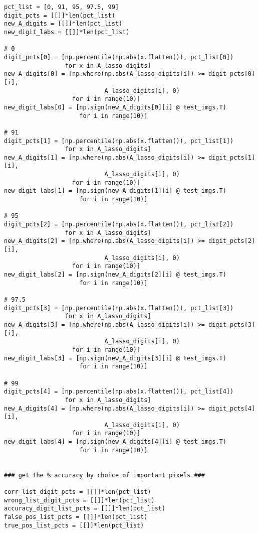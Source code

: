 \documentclass[10pt]{article}
\begin{document}
\begin{lstlisting}
pct_list = [0, 91, 95, 97.5, 99]
digit_pcts = [[]]*len(pct_list)
new_A_digits = [[]]*len(pct_list)
new_digit_labs = [[]]*len(pct_list)

# 0
digit_pcts[0] = [np.percentile(np.abs(x.flatten()), pct_list[0]) 
                 for x in A_lasso_digits]
new_A_digits[0] = [np.where(np.abs(A_lasso_digits[i]) >= digit_pcts[0][i],
                            A_lasso_digits[i], 0)
                   for i in range(10)]
new_digit_labs[0] = [np.sign(new_A_digits[0][i] @ test_imgs.T)
                     for i in range(10)]

# 91
digit_pcts[1] = [np.percentile(np.abs(x.flatten()), pct_list[1]) 
                 for x in A_lasso_digits]
new_A_digits[1] = [np.where(np.abs(A_lasso_digits[i]) >= digit_pcts[1][i],
                            A_lasso_digits[i], 0)
                   for i in range(10)]
new_digit_labs[1] = [np.sign(new_A_digits[1][i] @ test_imgs.T)
                     for i in range(10)]

# 95
digit_pcts[2] = [np.percentile(np.abs(x.flatten()), pct_list[2]) 
                 for x in A_lasso_digits]
new_A_digits[2] = [np.where(np.abs(A_lasso_digits[i]) >= digit_pcts[2][i],
                            A_lasso_digits[i], 0)
                   for i in range(10)]
new_digit_labs[2] = [np.sign(new_A_digits[2][i] @ test_imgs.T)
                     for i in range(10)]

# 97.5
digit_pcts[3] = [np.percentile(np.abs(x.flatten()), pct_list[3]) 
                 for x in A_lasso_digits]
new_A_digits[3] = [np.where(np.abs(A_lasso_digits[i]) >= digit_pcts[3][i],
                            A_lasso_digits[i], 0)
                   for i in range(10)]
new_digit_labs[3] = [np.sign(new_A_digits[3][i] @ test_imgs.T)
                     for i in range(10)]

# 99
digit_pcts[4] = [np.percentile(np.abs(x.flatten()), pct_list[4]) 
                 for x in A_lasso_digits]
new_A_digits[4] = [np.where(np.abs(A_lasso_digits[i]) >= digit_pcts[4][i],
                            A_lasso_digits[i], 0)
                   for i in range(10)]
new_digit_labs[4] = [np.sign(new_A_digits[4][i] @ test_imgs.T)
                     for i in range(10)]


### get the % accuracy by choice of important pixels ###

corr_list_digit_pcts = [[]]*len(pct_list)
wrong_list_digit_pcts = [[]]*len(pct_list)
accuracy_digit_list_pcts = [[]]*len(pct_list)
false_pos_list_pcts = [[]]*len(pct_list)
true_pos_list_pcts = [[]]*len(pct_list)


\end{lstlisting}
\end{document}
